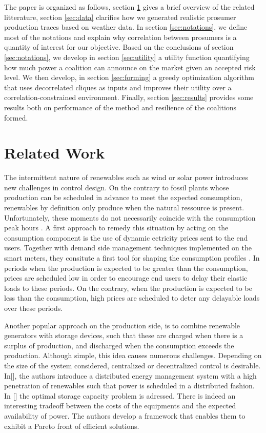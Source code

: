 \documentclass[conference]{IEEEtran}
\begin{document}
The paper is organized as follows, section \ref{sec:related} gives a brief overview of the related litterature, section \ref{sec:data} clarifies how we generated realistic prosumer production traces based on weather data. In section \ref{sec:notations}, we define most of the notations and explain why correlation between prosumers is a quantity of interest for our objective. Based on the conclusions of section \ref{sec:notations}, we develop in section \ref{sec:utility} a utility function quantifying how much power a coalition can announce on the market given an accepted risk level. We then develop, in section \ref{sec:forming} a greedy optimization algorithm that uses decorrelated cliques as inputs and improves their utility over a correlation-constrained environment. Finally, section \ref{sec:results} provides some results both on performance of the method and resilience of the coalitions formed.


%
%

\section{Related Work}
\label{sec:related}

The intermittent nature of renewables such as wind or solar power introduces new challenges in control design. On the contrary to fossil plants whose production can be scheduled in advance to meet the expected consumption, renewables by definition only produce when the natural ressource is present. Unfortunately, these moments do not necessarily coincide with the consumption peak hours \cite{Milligan2010}. A first approach to remedy this situation by acting on the consumption component is the use of dynamic ectricity prices sent to the end users. Together with demand side management techniques implemented on the smart meters, they consitute a first tool for shaping the consumption profiles \cite{Milligan2010}. In periods when the production is expected to be greater than the consumption, prices are scheduled low in order to encourage end users to delay their elastic loads to these periods. On the contrary, when the production is expected to be less than the consumption, high prices are scheduled to deter any delayable loads over these periods.

Another popular approach on the production side, is to combine renewable generators with storage devices, such that these are charged when there is a surplus of production, and discharged when the consumption exceeds the production. Although simple, this idea causes numerous challenges. Depending on the size of the system considered, centralized or decentralized control is desirable. In[], the authors introduce a distributed energy management system with a high penetration of renewables such that power is scheduled in a distributed fashion. In [] the optimal storage capacity problem is adressed. There is indeed an interesting tradeoff between the costs of the equipments and the expected availability of power. The authors develop a framework that enables them to exhibit a Pareto front of efficient solutions.
\end{document}
